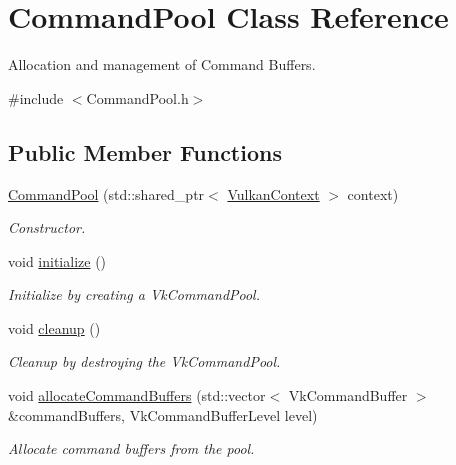\hypertarget{class_command_pool}{}\section{Command\+Pool Class Reference}
\label{class_command_pool}


Allocation and management of Command Buffers.  




{\ttfamily \#include $<$Command\+Pool.\+h$>$}

\subsection*{Public Member Functions}
\begin{DoxyCompactItemize}
\item 
\mbox{\hyperlink{class_command_pool_ace23b24c2f86842645c6c371edba8df5}{Command\+Pool}} (std\+::shared\+\_\+ptr$<$ \mbox{\hyperlink{class_vulkan_context}{Vulkan\+Context}} $>$ context)
\begin{DoxyCompactList}\small\item\em Constructor. \end{DoxyCompactList}\item 
\mbox{\label{class_command_pool_aa544338f9f63213d1d5d929853670b95}} 
void \mbox{\hyperlink{class_command_pool_aa544338f9f63213d1d5d929853670b95}{initialize}} ()
\begin{DoxyCompactList}\small\item\em Initialize by creating a Vk\+Command\+Pool. \end{DoxyCompactList}\item 
\mbox{\label{class_command_pool_ace0b12d239828aadeaf6b1e876a24533}} 
void \mbox{\hyperlink{class_command_pool_ace0b12d239828aadeaf6b1e876a24533}{cleanup}} ()
\begin{DoxyCompactList}\small\item\em Cleanup by destroying the Vk\+Command\+Pool. \end{DoxyCompactList}\item 
void \mbox{\hyperlink{class_command_pool_a333fb2b62823ad527f263bc0b8a72d4e}{allocate\+Command\+Buffers}} (std\+::vector$<$ Vk\+Command\+Buffer $>$ \&command\+Buffers, Vk\+Command\+Buffer\+Level level)
\begin{DoxyCompactList}\small\item\em Allocate command buffers from the pool. \end{DoxyCompactList}\item 

\end{DoxyCompactItemize}
